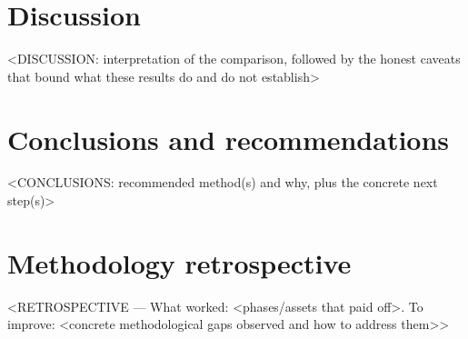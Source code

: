 \section{Discussion}
<DISCUSSION: interpretation of the comparison, followed by the honest caveats
that bound what these results do and do not establish>

\section{Conclusions and recommendations}
<CONCLUSIONS: recommended method(s) and why, plus the concrete next step(s)>

\section{Methodology retrospective}
<RETROSPECTIVE — What worked: <phases/assets that paid off>.
To improve: <concrete methodological gaps observed and how to address them>>
